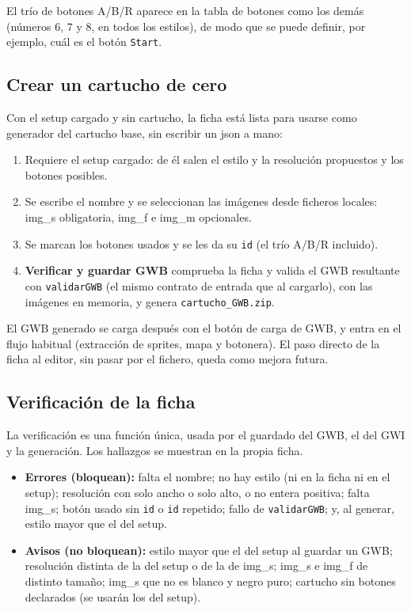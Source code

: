 El trío de botones A/B/R aparece en la tabla de botones como los demás (números 6, 7 y 8, en todos los estilos), de modo que se puede definir, por ejemplo, cuál es el botón \texttt{Start}.

\subsection{Crear un cartucho de cero}
\label{sec:F5I10Crear}

Con el setup cargado y sin cartucho, la ficha está lista para usarse como generador del cartucho base, sin escribir un json a mano:

\begin{enumerate}
	\item Requiere el setup cargado: de él salen el estilo y la resolución propuestos y los botones posibles.
	\item Se escribe el nombre y se seleccionan las imágenes desde ficheros locales: img\_s obligatoria, img\_f e img\_m opcionales.
	\item Se marcan los botones usados y se les da su \texttt{id} (el trío A/B/R incluido).
	\item \textbf{Verificar y guardar GWB} comprueba la ficha y valida el GWB resultante con \texttt{validarGWB} (el mismo contrato de entrada que al cargarlo), con las imágenes en memoria, y genera \texttt{cartucho\_GWB.zip}.
\end{enumerate}

El GWB generado se carga después con el botón de carga de GWB, y entra en el flujo habitual (extracción de sprites, mapa y botonera). El paso directo de la ficha al editor, sin pasar por el fichero, queda como mejora futura.

\subsection{Verificación de la ficha}
\label{sec:F5I10Verificacion}

La verificación es una función única, usada por el guardado del GWB, el del GWI y la generación. Los hallazgos se muestran en la propia ficha. 

\begin{itemize}
	\item \textbf{Errores (bloquean):} falta el nombre; no hay estilo (ni en la ficha ni en el setup); resolución con solo ancho o solo alto, o no entera positiva; falta img\_s; botón usado sin \texttt{id} o \texttt{id} repetido; fallo de \texttt{validarGWB}; y, al generar, estilo mayor que el del setup.
	\item \textbf{Avisos (no bloquean):} estilo mayor que el del setup al guardar un GWB; resolución distinta de la del setup o de la de img\_s; img\_s e img\_f de distinto tamaño; img\_s que no es blanco y negro puro; cartucho sin botones declarados (se usarán los del setup).
\end{itemize}

